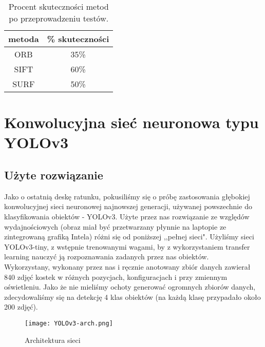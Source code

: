 \documentclass[polish,a4paper]{article}
\begin{document}
\begin{table}[H]
\centering
\begin{tabular}{|c|c|} 
\hline
metoda & \% skuteczności \\
\hline
ORB & 35\%\\
\hline
SIFT & 60\% \\
\hline
SURF & 50\% \\
\hline
\end{tabular}
\caption{Procent skuteczności metod po przeprowadzeniu testów.}
\end{table}

\section{Konwolucyjna sieć neuronowa typu YOLOv3}
\subsection{Użyte rozwiązanie}
Jako o ostatnią deskę ratunku, pokusiliśmy się o próbę zastosowania głębokiej konwolucyjnej sieci neuronowej\cite{conv} najnowszej generacji\cite{yolo3}, używanej powszechnie do klasyfikowania obiektów - YOLOv3\cite{yolo}. Użyte przez nas rozwiązanie ze względów wydajnościowych (obraz miał być przetwarzany płynnie na laptopie ze zintegrowaną grafiką Intela) różni się od poniższej ,,pełnej sieci". Użyliśmy sieci YOLOv3-tiny, z wstępnie trenowanymi wagami, by z wykorzystaniem transfer learning\cite{transfer} nauczyć ją rozpoznawania zadanych przez nas obiektów.\\
Wykorzystany, wykonany przez nas i ręcznie anotowany zbiór danych zawierał 840 zdjęć kostek w różnych pozycjach, konfiguracjach i przy zmiennym oświetleniu. Jako że nie mieliśmy ochoty generować ogromnych zbiorów danych, zdecydowaliśmy się na detekcję 4 klas obiektów (na każdą klasę przypadało około 200 zdjęć).
\begin{figure}[H]
\centering
\texttt{[image: YOLOv3-arch.png]}
\caption{Architektura sieci}
\end{figure} 
\end{document}
